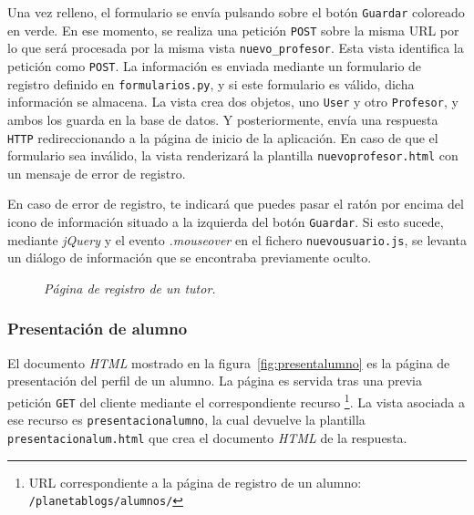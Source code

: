 \documentclass[a4paper, 12pt]{book}
\begin{document}
Una vez relleno, el formulario se env\'ia pulsando sobre el bot\'on \texttt{Guardar} coloreado en verde. En ese momento, se realiza una petici\'on 
\texttt{POST} sobre la misma URL por lo que ser\'a procesada por la misma vista \texttt{nuevo\_profesor}. Esta vista identifica la petici\'on como 
\texttt{POST}. La informaci\'on es enviada mediante un formulario de registro definido en \texttt{formularios.py}, y si este formulario es v\'alido, dicha
informaci\'on se almacena. La vista crea dos objetos, uno \texttt{User} y otro \texttt{Profesor}, y ambos los guarda en la base de datos. Y posteriormente, 
env\'ia una respuesta \texttt{HTTP} redireccionando a la p\'agina de inicio de la aplicaci\'on. En caso de que el formulario sea inv\'alido, la vista 
renderizar\'a la plantilla \texttt{nuevoprofesor.html} con un mensaje de error de registro.

En caso de error de registro, te indicar\'a que puedes pasar el rat\'on por encima del icono de informaci\'on situado a la izquierda del bot\'on 
\texttt{Guardar}. Si esto sucede, mediante \textit{jQuery} y el evento \textit{.mouseover} en el fichero \texttt{nuevousuario.js}, se levanta un di\'alogo 
de informaci\'on que se encontraba previamente oculto.
\begin{figure}
  \centering
  \caption{\textit{P\'agina de registro de un tutor.}}
  \label{fig:registrotutor}
\end{figure}


\subsubsection{Presentaci\'on de alumno} 
\label{sec:presentacionalumno}
El documento \textit{HTML} mostrado en la figura~\ref{fig:presentalumno} es la p\'agina de presentaci\'on del perfil de un alumno. La p\'agina es servida 
tras una previa petici\'on \texttt{GET} del cliente mediante el correspondiente recurso \footnote{URL correspondiente a la p\'agina de registro de un alumno: 
\texttt{/planetablogs/alumnos/}}. La vista asociada a ese recurso es \texttt{presentacionalumno}, la cual devuelve la plantilla 
\texttt{presentacionalum.html} que crea el documento \textit{HTML} de la respuesta.
\end{document}
